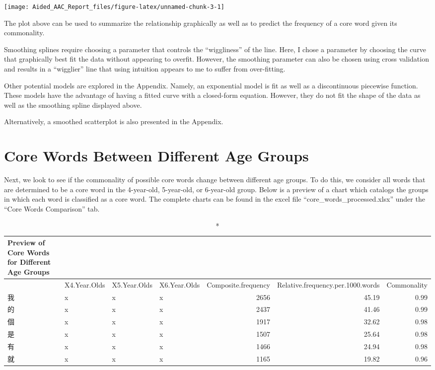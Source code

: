 \documentclass[
]{article}
\begin{document}
\begin{center}\texttt{[image: Aided\_AAC\_Report\_files/figure-latex/unnamed-chunk-3-1]} \end{center}

The plot above can be used to summarize the relationship graphically as
well as to predict the frequency of a core word given its commonality.

Smoothing splines require choosing a parameter that controls the
``wiggliness'' of the line. Here, I chose a parameter by choosing the
curve that graphically best fit the data without appearing to overfit.
However, the smoothing parameter can also be chosen using cross
validation and results in a ``wigglier'' line that using intuition
appears to me to suffer from over-fitting.

Other potential models are explored in the Appendix. Namely, an
exponential model is fit as well as a discontinuous piecewise function.
These models have the advantage of having a fitted curve with a
closed-form equation. However, they do not fit the shape of the data as
well as the smoothing spline displayed above.

Alternatively, a smoothed scatterplot is also presented in the Appendix.

\hypertarget{core-words-between-different-age-groups}{%
\section{Core Words Between Different Age
Groups}\label{core-words-between-different-age-groups}}

Next, we look to see if the commonality of possible core words change
between different age groups. To do this, we consider all words that are
determined to be a core word in the 4-year-old, 5-year-old, or
6-year-old group. Below is a preview of a chart which catalogs the
groups in which each word is classified as a core word. The complete
charts can be found in the excel file ``core\_words\_processed.xlsx''
under the ``Core Words Comparison'' tab.

\begin{longtable}{l|lllrrr}
\caption*{
{\large Preview of Core Words for Different Age Groups}
} \\ 
\toprule
\multicolumn{1}{l}{} & X4.Year.Olds & X5.Year.Olds & X6.Year.Olds & Composite.frequency & Relative.frequency.per.1000.words & Commonality \\ 
\midrule\addlinespace[2.5pt]
我 & x & x & x & 2656 & 45.19 & 0.99 \\ 
的 & x & x & x & 2437 & 41.46 & 0.99 \\ 
個 & x & x & x & 1917 & 32.62 & 0.98 \\ 
是 & x & x & x & 1507 & 25.64 & 0.98 \\ 
有 & x & x & x & 1466 & 24.94 & 0.98 \\ 
就 & x & x & x & 1165 & 19.82 & 0.96 \\ 
\bottomrule
\end{longtable}
\end{document}
